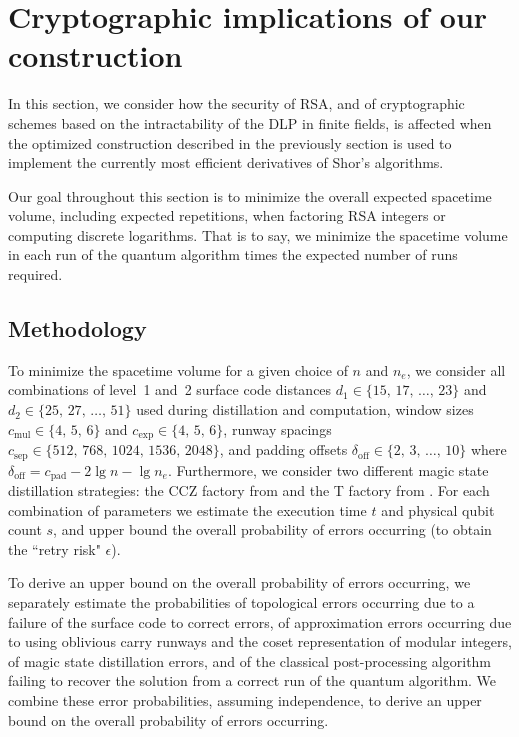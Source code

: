 \documentclass[superscriptaddress,notitlepage,longbibliography]{revtex4-1}
\theoremstyle{definition}
\theoremstyle{definition}
\newcommand{\lenexp}{{n_e}}
\newcommand{\devoff}{{\delta_{\text{off}}}}
\newcommand{\gexp}{{c_{\text{exp}}}}
\newcommand{\gmul}{{c_{\text{mul}}}}
\newcommand{\gsep}{{c_{\text{sep}}}}
\newcommand{\gpad}{{c_{\text{pad}}}}
\newcommand{\distone}{{d_1}}
\newcommand{\disttwo}{{d_2}}
\begin{document}
\section{Cryptographic implications of our construction}
\label{sec:impact}
In this section, we consider how the security of RSA, and of cryptographic schemes based on the intractability of the DLP in finite fields, is affected when the optimized construction described in the previously section is used to implement the currently most efficient derivatives of Shor's algorithms.

Our goal throughout this section is to minimize the overall expected spacetime volume, including expected repetitions, when factoring RSA integers or computing discrete logarithms. That is to say, we minimize the spacetime volume in each run of the quantum algorithm times the expected number of runs required.

\subsection{Methodology}
\label{sec:methodology}
To minimize the spacetime volume for a given choice of $n$ and $\lenexp$, we consider all combinations of
  level~1 and~2 surface code distances $\distone \in \{ 15, \, 17, \, \dots, \, 23 \}$ and $\disttwo \in \{ 25, \, 27, \, \dots, \, 51 \}$ used during distillation and computation,
  window sizes $\gmul \in \{ 4, \, 5, \, 6 \}$ and $\gexp \in \{ 4, \, 5, \, 6 \}$,
  runway spacings $\gsep \in \{ 512, \, 768, \, 1024, \, 1536, \, 2048 \}$,
  and padding offsets $\devoff \in \{ 2, \, 3, \, \dots, \, 10 \}$ where $\devoff = \gpad - 2 \lg n - \lg \lenexp$.
Furthermore, we consider two different magic state distillation strategies: the CCZ factory from \cite{gidney2018magic, gidney2019autoccz} and the T factory from \cite{fowler2018}.
For each combination of parameters we estimate the execution time $t$ and physical qubit count $s$, and upper bound the overall probability of errors occurring (to obtain the ``retry risk" $\epsilon$).

To derive an upper bound on the overall probability of errors occurring, we separately estimate the probabilities
  of topological errors occurring due to a failure of the surface code to correct errors,
  of approximation errors occurring due to using oblivious carry runways and the coset representation of modular integers,
  of magic state distillation errors,
  and of the classical post-processing algorithm failing to recover the solution from a correct run of the quantum algorithm.
We combine these error probabilities, assuming independence, to derive an upper bound on the overall probability of errors occurring.
\end{document}
